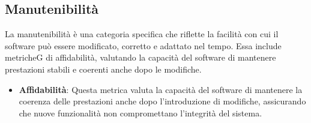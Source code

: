 \subsection{Manutenibilità}
La manutenibilità è una categoria specifica che riflette la facilità con cui il software può
essere modificato, corretto e adattato nel tempo. Essa include metricheG di affidabilità,
valutando la capacità del software di mantenere prestazioni stabili e coerenti anche dopo le
modifiche.
\begin{itemize}
    \item \textbf{Affidabilità}: Questa metrica valuta la capacità del software di mantenere la coerenza delle prestazioni anche 
    dopo l’introduzione di modifiche, assicurando che nuove funzionalità non compromettano l’integrità del sistema.
\end{itemize}